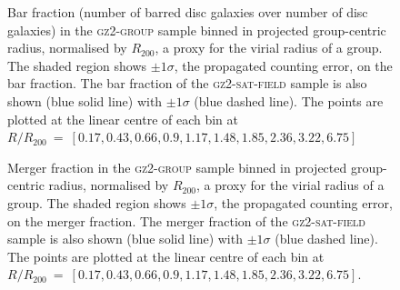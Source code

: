 \documentclass[useAMS,usenatbib]{mn2e}
\begin{document}
\begin{figure}
\caption[Bar fraction with group radius in the \textsc{gz2-group} sample]{Bar fraction (number of barred disc galaxies over number of disc galaxies) in the \textsc{gz2-group} sample binned in projected group-centric radius, normalised by $R_{200}$, a proxy for the virial radius of a group. The shaded region shows $\pm1\sigma$, the propagated counting error, on the bar fraction. The bar fraction of the \textsc{gz2-sat-field} sample is also shown (blue solid line) with $\pm1\sigma$ (blue dashed line). The points are plotted at the linear centre of each bin at $R/R_{200}~=~ [0.17,  0.43,  0.66,  0.9 ,  1.17,  1.48,  1.85,  2.36,  3.22,  6.75]$}
\label{fig:barradius}
\end{figure}

\begin{figure}
\caption[Merger fraction with group radius in the \textsc{gz2-group} sample]{Merger fraction in the \textsc{gz2-group} sample binned in projected group-centric radius, normalised by $R_{200}$, a proxy for the virial radius of a group. The shaded region shows $\pm1\sigma$, the propagated counting error, on the merger fraction. The merger fraction of the \textsc{gz2-sat-field} sample is also shown (blue solid line) with $\pm1\sigma$ (blue dashed line). The points are plotted at the linear centre of each bin at $R/R_{200}~=~ [0.17,  0.43,  0.66,  0.9 ,  1.17,  1.48,  1.85,  2.36,  3.22,  6.75]$.}
\label{fig:mergerradius}
\end{figure}
\end{document}
